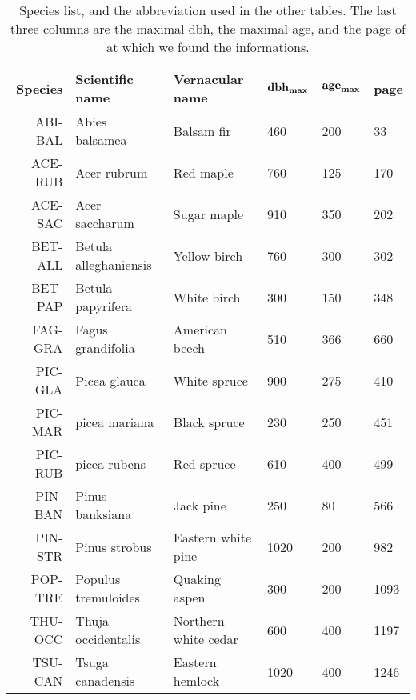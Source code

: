 \documentclass[letterpaper, 12pt]{article}
\theoremstyle{theo}
\begin{document}
\begin{refsection}
\begin{onehalfspace}
\begin{table}[h!]
\centering
\caption{Species list, and the abbreviation used in the other tables\label{tab::species}. The last three columns are the maximal dbh, the maximal age, and the page of \citet{Burns1990, Burns1990a} at which we found the informations.}
\label{tab::database}
\begin{tabular}{rlllll}
	\toprule
	\textbf{Species} & \textbf{Scientific name} & \textbf{Vernacular name} & $ \text{\textbf{dbh}}_{\bm{\max}} $ & $ \text{\textbf{age}}_{\bm{\max}} $ & \textbf{page} \\
	\midrule
	ABI-BAL & Abies balsamea & Balsam fir & 460 & 200 & 33 \\
	ACE-RUB & Acer rubrum & Red maple & 760 & 125 & 170 \\
	ACE-SAC & Acer saccharum & Sugar maple & 910 & 350 & 202 \\
	BET-ALL & Betula alleghaniensis & Yellow birch & 760 & 300 & 302 \\
	BET-PAP & Betula papyrifera & White birch & 300 & 150 & 348 \\
	FAG-GRA & Fagus grandifolia & American beech & 510 & 366 & 660 \\
	PIC-GLA & Picea glauca & White spruce & 900 & 275 & 410 \\
	PIC-MAR & picea mariana & Black spruce & 230 & 250 & 451 \\
	PIC-RUB & picea rubens & Red spruce & 610 & 400 & 499 \\
	PIN-BAN & Pinus banksiana & Jack pine & 250 &  80 & 566 \\
	PIN-STR & Pinus strobus & Eastern white pine & 1020 & 200 & 982 \\
	POP-TRE & Populus tremuloides & Quaking aspen & 300 & 200 & 1093 \\
	THU-OCC & Thuja occidentalis & Northern white cedar & 600 & 400 & 1197 \\
	TSU-CAN & Tsuga canadensis & Eastern hemlock & 1020 & 400 & 1246 \\
	\bottomrule
\end{tabular}
\end{table}


\end{onehalfspace}
\end{refsection}
\end{document}
